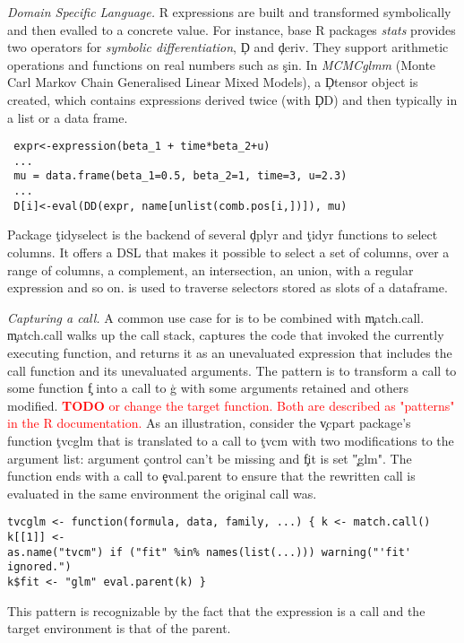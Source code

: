 \documentclass[review,screen,acmsmall,anonymous=true]{acmart}
\newcommand{\mypara}[1]{\medskip\noindent\emph{#1}\xspace}
\newcommand{\authorcomment}[3]{\xspace\textcolor{#1}{{\bf #2} #3}\xspace}
\newcommand{\todo}[1]{\authorcomment{red}{TODO}{#1}}
\begin{document}

\mypara{Domain Specific Language.} R expressions are built and transformed symbolically and then evalled to a concrete value. For instance,   base R packages \emph{stats} provides two operators for \emph{symbolic differentiation}, \c{D} and \c{deriv}. They support arithmetic operations and functions on real numbers such as \c{sin}.
In \emph{MCMCglmm} (Monte Carl Markov Chain Generalised Linear Mixed Models), a \c{Dtensor} object is created, which contains expressions derived twice (with \c{DD}) and then typically in a list or a data frame.
\begin{lstlisting}
 expr<-expression(beta_1 + time*beta_2+u)
 ...
 mu = data.frame(beta_1=0.5, beta_2=1, time=3, u=2.3)
 ...
 D[i]<-eval(DD(expr, name[unlist(comb.pos[i,])]), mu)
\end{lstlisting}

Package \c{tidyselect} is the backend of several \c{dplyr} and \c{tidyr} functions to select columns. It offers a DSL that makes it possible to select a set of columns, over a range of columns, a complement, an intersection, an union, with a regular expression and so on. \eval is used to traverse selectors stored as slots of a dataframe.


\mypara{Capturing a call.}  A common use case for \eval is to be combined with \c{match.call}.
\c{match.call} walks up the call stack, captures the code that invoked the
currently executing function, and returns it as an unevaluated expression that includes the call function and its unevaluated arguments. The
pattern is to transform a call to some function \c{f} into a call to \c{g} with
some arguments retained and others modified.  \todo{or change the target
function. Both are described as "patterns" in the R documentation.} As an
illustration, consider the \c{vcpart} package's function \c{tvcglm} that is
translated to a call to \c{tvcm} with two modifications to the argument list:
argument \c{control} can't be missing and \c{fit} is set \c{"glm"}. The
function ends with a call to \c{eval.parent} to ensure that the rewritten call
is evaluated in the same environment the original call was.  \begin{lstlisting}
tvcglm <- function(formula, data, family, ...) { k <- match.call() k[[1]] <-
as.name("tvcm") if ("fit" %in% names(list(...))) warning("'fit' ignored.")
k$fit <- "glm" eval.parent(k) } \end{lstlisting} This pattern is recognizable
by the fact that the expression is a call and the target environment is that of
the parent.
\end{document}
